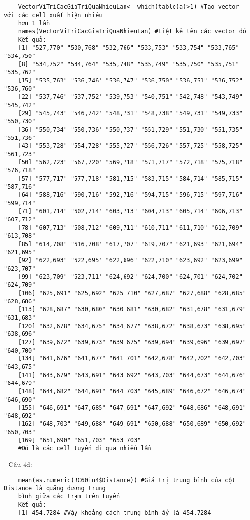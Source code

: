 \documentclass[a4paper]{article}
\begin{document}
	\begin{verbatim}
	VectorViTriCacGiaTriQuaNhieuLan<- which(table(a)>1) #Tạo vector với các cell xuất hiện nhiều 
	hơn 1 lần
	names(VectorViTriCacGiaTriQuaNhieuLan) #Liệt kê tên các vector đó
	Kết quả:
    [1] "527,770" "530,768" "532,766" "533,753" "533,754" "533,765" "534,750"
    [8] "534,752" "534,764" "535,748" "535,749" "535,750" "535,751" "535,762"
    [15] "535,763" "536,746" "536,747" "536,750" "536,751" "536,752" "536,760"
    [22] "537,746" "537,752" "539,753" "540,751" "542,748" "543,749" "545,742"
    [29] "545,743" "546,742" "548,731" "548,738" "549,731" "549,733" "550,730"
    [36] "550,734" "550,736" "550,737" "551,729" "551,730" "551,735" "551,736"
    [43] "553,728" "554,728" "555,727" "556,726" "557,725" "558,725" "561,723"
    [50] "562,723" "567,720" "569,718" "571,717" "572,718" "575,718" "576,718"
    [57] "577,717" "577,718" "581,715" "583,715" "584,714" "585,715" "587,716"
    [64] "588,716" "590,716" "592,716" "594,715" "596,715" "597,716" "599,714"
    [71] "601,714" "602,714" "603,713" "604,713" "605,714" "606,713" "607,712"
    [78] "607,713" "608,712" "609,711" "610,711" "611,710" "612,709" "613,708"
    [85] "614,708" "616,708" "617,707" "619,707" "621,693" "621,694" "621,695"
    [92] "622,693" "622,695" "622,696" "622,710" "623,692" "623,699" "623,707"
    [99] "623,709" "623,711" "624,692" "624,700" "624,701" "624,702" "624,709"
    [106] "625,691" "625,692" "625,710" "627,687" "627,688" "628,685" "628,686"
    [113] "628,687" "630,680" "630,681" "630,682" "631,678" "631,679" "631,683"
    [120] "632,678" "634,675" "634,677" "638,672" "638,673" "638,695" "638,696"
    [127] "639,672" "639,673" "639,675" "639,694" "639,696" "639,697" "640,700"
    [134] "641,676" "641,677" "641,701" "642,678" "642,702" "642,703" "643,675"
    [141] "643,679" "643,691" "643,692" "643,703" "644,673" "644,676" "644,679"
    [148] "644,682" "644,691" "644,703" "645,689" "646,672" "646,674" "646,690"
    [155] "646,691" "647,685" "647,691" "647,692" "648,686" "648,691" "648,692"
    [162] "648,703" "649,688" "649,691" "650,688" "650,689" "650,692" "650,703"
    [169] "651,690" "651,703" "653,703"
	#Đó là các cell tuyến đi qua nhiều lần
	\end{verbatim}
	- Câu 4d: \\
	\begin{verbatim}
	mean(as.numeric(RC60in4$Distance)) #Giá trị trung bình của cột Distance là quãng đường trung 
	bình giữa các trạm trên tuyến
	Kết quả: 
	[1] 454.7284 #Vậy khoảng cách trung bình ấy là 454.7284
	\end{verbatim}
\end{document}
